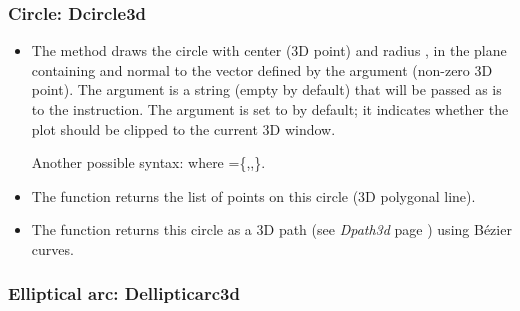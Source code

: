 \subsubsection{Circle: Dcircle3d}

\begin{itemize}
    \item The method  draws the circle with center  (3D point) and radius , in the plane containing  and normal to the vector defined by the argument  (non-zero 3D point). The  argument is a string (empty by default) that will be passed as is to the \drawcmd instruction. The  argument is set to \false by default; it indicates whether the plot should be clipped to the current 3D window.

Another possible syntax:  where =\{,,\}.

    \item The  function returns the list of points on this circle (3D polygonal line).

    \item The  function returns this circle as a 3D path (see \emph{Dpath3d} page \pageref{Dpath3d}) using Bézier curves.
\end{itemize}

\subsubsection{Elliptical arc: Dellipticarc3d}

